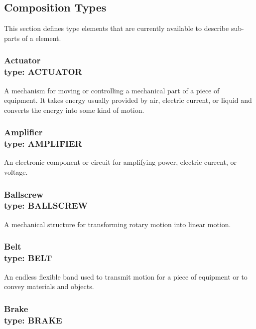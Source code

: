 \subsection{Composition Types} \label{sec:Composition Types}


This section defines  type elements that are currently available to describe sub-parts of a  element.


\subsubsection[Actuator]{Actuator \\ {\small type: ACTUATOR}}




A mechanism for moving or controlling a mechanical part of a piece of equipment.   
 It takes energy usually provided by air, electric current, or liquid and converts the energy into some kind of motion. 


\subsubsection[Amplifier]{Amplifier \\ {\small type: AMPLIFIER}}
\label{sec:Amplifier}



An electronic component or circuit for amplifying power, electric current, or voltage.


\subsubsection[Ballscrew]{Ballscrew \\ {\small type: BALLSCREW}}
\label{sec:Ballscrew}



A mechanical structure for transforming rotary motion into linear motion.


\subsubsection[Belt]{Belt \\ {\small type: BELT}}
\label{sec:Belt}



An endless flexible band used to transmit motion for a piece of equipment or to convey materials and objects.


\subsubsection[Brake]{Brake \\ {\small type: BRAKE}}
\label{sec:Brake}



